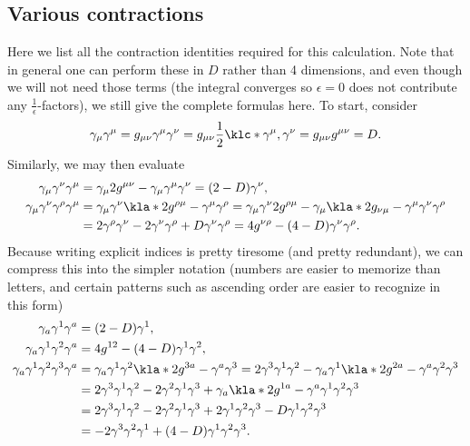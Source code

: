 \documentclass[english, parskip=full]{scrbook}
\begin{document}
\subsection{Various contractions}
Here we list all the contraction identities required for this calculation.
Note that in general one can perform these in $D$ rather than 4 dimensions, and even though we will not need those terms (the integral converges so $\epsilon=0$ does not contribute any $\frac{1}{\epsilon}$-factors), we still give the complete formulas here.
To start, consider
\begin{align}
\gamma_\mu\gamma^\mu = g_{\mu\nu} \gamma^\mu\gamma^\nu = g_{\mu\nu} \frac{1}{2} \klc*{\gamma^\mu,\gamma^\nu } = g_{\mu\nu} g^{\mu\nu} = D.
\end{align}
Similarly, we may then evaluate
\begin{align}
\gamma_\mu \gamma^\nu\gamma^\mu &= \gamma_\mu 2g^{\mu\nu} - \gamma_\mu\gamma^\mu\gamma^\nu = (2-D)\gamma^\nu,\\
\gamma_\mu \gamma^\nu \gamma^\rho\gamma^\mu &= \gamma_\mu\gamma^\nu \kla*{2g^{\rho\mu} - \gamma^\mu\gamma^\rho } = \gamma_\mu\gamma^\nu 2g^{\rho\mu} - \gamma_\mu \kla*{2g_{\nu\mu} - \gamma^\mu \gamma^\nu }\gamma^\rho\\
&= 2\gamma^\rho\gamma^\nu - 2\gamma^\nu \gamma^\rho + D\gamma^\nu\gamma^\rho = 4g^{\nu\rho} - (4-D) \gamma^\nu\gamma^\rho.
\end{align}
Because writing explicit indices is pretty tiresome (and pretty redundant), we can compress this into the simpler notation (numbers are easier to memorize than letters, and certain patterns such as ascending order are easier to recognize in this form)
\begin{align}
\gamma_a\gamma^1\gamma^a &= (2-D)\gamma^1,\\
\gamma_a\gamma^1\gamma^2\gamma^a &= 4g^{12} - (4-D)\gamma^1\gamma^2,\\
\gamma_a\gamma^1\gamma^2\gamma^3\gamma^a &= \gamma_a \gamma^1\gamma^2 \kla*{2g^{3a} - \gamma^a\gamma^3} = 2\gamma^3\gamma^1\gamma^2 - \gamma_a \gamma^1 \kla*{2g^{2a} - \gamma^a \gamma^2}\gamma^3\\
&= 2\gamma^3\gamma^1\gamma^2 - 2\gamma^2\gamma^1\gamma^3 + \gamma_a \kla*{2g^{1a} - \gamma^a \gamma^1}\gamma^2\gamma^3\\
&= 2\gamma^3\gamma^1\gamma^2 - 2\gamma^2\gamma^1\gamma^3 + 2\gamma^1\gamma^2\gamma^3 - D\gamma^1\gamma^2\gamma^3\\
&= -2\gamma^3\gamma^2\gamma^1 + (4-D)\gamma^1\gamma^2\gamma^3.
\end{align}
\end{document}
